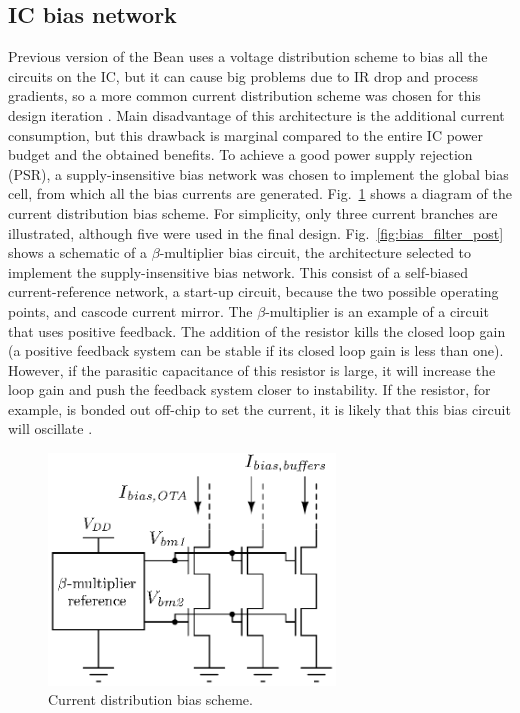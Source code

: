 \subsection{IC bias network}
Previous version of the Bean uses a voltage distribution scheme to bias all the circuits on the IC, but it can cause big problems due to IR drop and process gradients, so a more common current distribution scheme was chosen for this design iteration \citep{murmann101}.  Main disadvantage of this architecture is the additional current consumption, but this drawback is marginal compared to the entire IC power budget and the obtained benefits. To achieve a good power supply rejection (PSR), a supply-insensitive bias network was chosen to implement the global bias cell, from which all the bias currents are generated. Fig.~\ref{fig:bias_all_post} shows a diagram of the current distribution bias scheme. For simplicity, only three current branches are illustrated, although five were used in the final design. Fig.~\ref{fig:bias_filter_post} shows a schematic of a $\beta$-multiplier bias circuit, the architecture selected to implement the supply-insensitive bias network. This consist of a \mbox{self-biased} \mbox{current-reference} network, a \mbox{start-up} circuit, because the two possible operating points, and cascode current mirror. The $\beta$-multiplier is an example of a circuit that uses positive feedback. The addition of the resistor kills the closed loop gain (a positive feedback system can be stable if its closed loop gain is less than one). However, if the parasitic capacitance of this resistor is large, it will increase the loop gain and push the feedback system closer to instability. If the resistor, for example, is bonded out off-chip to set the current, it is likely that this bias circuit will oscillate \citep{baker101}.

\begin{figure}[!t]
	\centering
	\includegraphics[width=3in]{./Figures/Filter/bias_all_post.eps}
	\caption{Current distribution bias scheme.}\label{fig:bias_all_post}
\end{figure}

